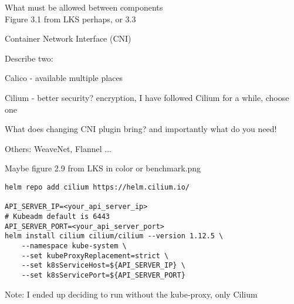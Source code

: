 \documentclass[Screen16to9,17pt]{foils}
\begin{document}
\begin{list2}
\item What must be allowed between components\\
Figure 3.1 from LKS perhaps, or 3.3
\end{list2}

\begin{list2}
\item
Container Network Interface (CNI)
\end{list2}



Describe two:
\begin{list2}
\item Calico - available multiple places
\item Cilium - better security? encryption, I have followed Cilium for a while, choose one
\item What does changing CNI plugin bring? and importantly what do you need!
\end{list2}



\begin{list2}
\item {}

\item Others: WeaveNet, Flannel ...

\item Maybe figure 2.9 from LKS in color or benchmark.png
\end{list2}


\begin{verbatim}
helm repo add cilium https://helm.cilium.io/

API_SERVER_IP=<your_api_server_ip>
# Kubeadm default is 6443
API_SERVER_PORT=<your_api_server_port>
helm install cilium cilium/cilium --version 1.12.5 \
    --namespace kube-system \
    --set kubeProxyReplacement=strict \
    --set k8sServiceHost=${API_SERVER_IP} \
    --set k8sServicePort=${API_SERVER_PORT}
\end{verbatim}

\begin{list2}
\item
\end{list2}
Note: I ended up deciding to run without the kube-proxy, only Cilium
\end{document}
